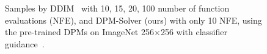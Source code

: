 \begin{figure}[t]
	\caption{\small{Samples by DDIM~\citep{song2020denoising} with 10, 15, 20, 100 number of function evaluations (NFE), and DPM-Solver (ours) with only 10 NFE, using the pre-trained DPMs on ImageNet 256$\times$256 with classifier guidance~\citep{dhariwal2021diffusion}.}
	\label{fig:intro}
}
\vspace{-.2in}
\end{figure}




